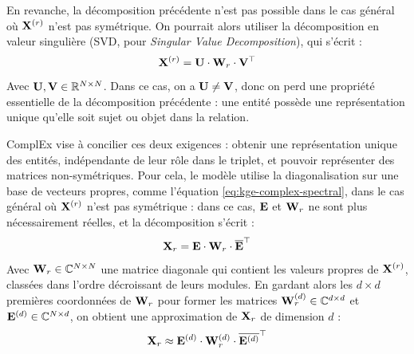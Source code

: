 En revanche, la décomposition précédente n'est pas possible dans le cas général où $\bf{X}^{(r)}$ n'est pas symétrique. On pourrait alors utiliser la décomposition en valeur singulière (SVD, pour \textit{Singular Value Decomposition}), qui s'écrit :
\begin{equation}
    \bf{X}^{(r)} = \bf{U} \cdot \bf{W}_r \cdot \bf{V}^\top
\end{equation}
Avec $\bf{U}, \bf{V} \in \R^{N \times N}$. Dans ce cas, on a $\bf{U \neq V}$, donc on perd une propriété essentielle de la décomposition précédente : une entité possède une représentation unique qu'elle soit sujet ou objet dans la relation. 

ComplEx vise à concilier ces deux exigences : obtenir une représentation unique des entités, indépendante de leur rôle dans le triplet, et pouvoir représenter des matrices non-symétriques. Pour cela, le modèle utilise la diagonalisation sur une base de vecteurs propres, comme l'équation \ref{eq:kge-complex-spectral}, dans le cas général où $\bf{X}^{(r)}$ n'est pas symétrique : dans ce cas, $\bf{E}$ et $\bf{W}_r$ ne sont plus nécessairement réelles, et la décomposition s'écrit :
\begin{equation}
    \bf{X}_r = \bf{E} \cdot \bf{W}_r \cdot \compconj{\bf{E}}^\top
    \label{eq:kge-complex-main}
\end{equation}
Avec $\bf{W}_r \in \mathbb{C}^{N \times N}$ une matrice diagonale qui contient les valeurs propres de $\bf{X}^{(r)}$, classées dans l'ordre décroissant de leurs modules. En gardant alors les $d \times d$ premières coordonnées de $\bf{W}_r$ pour former les matrices $\bf{W}_r^{(d)} \in \mathbb{C}^{d \times d}$ et $\bf{E}^{(d)} \in \mathbb{C}^{N \times d}$, on obtient une approximation de $\bf{X}_r$ de dimension $d$ :
\begin{equation}
    \bf{X}_r \approx \bf{E}^{(d)} \cdot \bf{W}_r^{(d)} \cdot \compconj{ \bf{E}^{(d)}}^\top
\end{equation}

